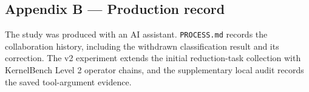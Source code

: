 \documentclass[
  11pt,
]{article}
\begin{document}
\hypertarget{appendix-b-production-record}{%
\subsection{Appendix B --- Production
record}\label{appendix-b-production-record}}

The study was produced with an AI assistant. \texttt{PROCESS.md} records
the collaboration history, including the withdrawn classification result
and its correction. The v2 experiment extends the initial reduction-task
collection with KernelBench Level 2 operator chains, and the
supplementary local audit records the saved tool-argument evidence.

  \begingroup
{}

\endgroup
\end{document}
